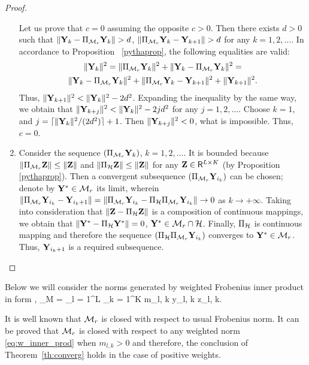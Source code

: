 \documentclass[sii]{ipart}
\begin{document}
\begin{proof}
\begin{enumerate}
		Let us prove that $c = 0$ assuming the opposite $c > 0$. Then there exists $d > 0$ such that $\|\mathbf{Y}_k - \Pi_{\mathcal{M}_r} \mathbf{Y}_k\| > d$, $\|\Pi_{\mathcal{M}_r} \mathbf{Y}_k - \mathbf{Y}_{k + 1}\| > d$ for any $k = 1, 2, \ldots$. In accordance to Proposition ~\ref{pythaprop}, the following equalities are valid:
		\begin{multline*}
		\|\bfY_k\|^2 = \|\Pi_{\calM_r} \bfY_k\|^2 + \|\bfY_k - \Pi_{\calM_r} \bfY_k\|^2 =\\ \|\bfY_k - \Pi_{\calM_r} \bfY_k\|^2 + \|\Pi_{\calM_r} \bfY_k - \bfY_{k + 1}\|^2 + \|\bfY_{k + 1}\|^2.
		\end{multline*}
		Thus, $\|\mathbf{Y}_{k+1}\|^2 < \|\mathbf{Y}_k\|^2 - 2d^2$. Expanding the inequality by the same way, we obtain that $\|\mathbf{Y}_{k+j}\|^2 < \|\mathbf{Y}_k\|^2 - 2 j d^2$ for any $j = 1, 2, \ldots$. Choose $k = 1$, and $j = \lceil \|\mathbf{Y}_k\|^2 / (2d^2) \rceil + 1$. Then $\|\mathbf{Y}_{k+j}\|^2 < 0$, what is impossible. Thus, $c=0$.
		\item Consider the sequence $(\Pi_{\mathcal{M}_r} \mathbf{Y}_k)$, $k = 1, 2, \ldots$. It is bounded because $\|\Pi_{\mathcal{M}_r} \mathbf{Z}\| \le \|\mathbf{Z}\|$ and $\|\Pi_{\mathcal{H}} \mathbf{Z}\| \le \|\mathbf{Z}\|$ for any $\mathbf{Z} \in \mathsf{R}^{L \times K}$ (by Proposition \ref{pythaprop}). Then a convergent subsequence $(\Pi_{\mathcal{M}_r} \mathbf{Y}_{i_k})$ can be chosen; denote by $\mathbf{Y}^*\in\mathcal{M}_r$ its limit, wherein $\|\Pi_{\mathcal{M}_r} \mathbf{Y}_{i_k} - \mathbf{Y}_{i_k + 1}\| = \|\Pi_{\mathcal{M}_r} \mathbf{Y}_{i_k} - \Pi_{\mathcal{H}} \Pi_{\mathcal{M}_r} \mathbf{Y}_{i_k}\| \to 0$ as $k \to + \infty$. Taking into consideration that $\|\mathbf{Z} - \Pi_{\mathcal{H}} \mathbf{Z}\|$ is a composition of continuous mappings, we obtain that $\|\mathbf{Y}^* - \Pi_{\mathcal{H}} \mathbf{Y}^*\| = 0$, $\mathbf{Y}^* \in \mathcal{M}_r \cap \mathcal{H}$. Finally, $\Pi_{\mathcal{H}}$ is continuous mapping and therefore the sequence $(\Pi_{\mathcal{H}} \Pi_{\mathcal{M}_r} \mathbf{Y}_{i_k})$ converges to $\mathbf{Y}^*\in\mathcal{M}_r$. Thus, $\mathbf{Y}_{i_k + 1}$ is a required subsequence.
	\end{enumerate}
\end{proof}

Below we will consider the norms generated by weighted Frobenius inner product in form
\be
\label{eq:w_inner_prod}
\langle\bfY, \bfZ\rangle_M = \sum_{l = 1}^L \sum_{k = 1}^K m_{l, k} y_{l, k} z_{l, k}.
\ee

It is well known that $\mathcal{M}_r$ is closed with respect to usual Frobenius norm. It can be proved that $\mathcal{M}_r$ is closed with respect to any weighted norm \eqref{eq:w_inner_prod} when $m_{l,k} > 0$ and therefore, the conclusion of Theorem~\ref{th:converg} holds in the case of positive weights.
\end{document}
